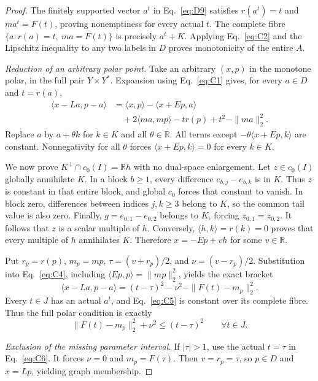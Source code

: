 \documentclass[11pt]{article}
\newcommand{\R}{\mathbb R}
\newcommand{\pair}[2]{\langle #1,#2\rangle}
\begin{document}
\begin{proof}
The finitely supported vector $a^t$ in Eq.~\eqref{eq:D9} satisfies $r(a^t)=t$ and
$ma^t=F(t)$, proving nonemptiness for every actual $t$. The complete
fibre $\{a:r(a)=t,\ ma=F(t)\}$ is precisely $a^t+K$.
Applying Eq.~\eqref{eq:C2} and the Lipschitz inequality to any two labels
in $D$ proves monotonicity of the entire $A$.

\noindent\textit{Reduction of an arbitrary polar point.}
\label{sec:C3}
Take an arbitrary $(x,p)$ in the monotone polar, in the full pair
$Y\times Y^*$. Expansion using Eq.~\eqref{eq:C1} gives, for every
$a\in D$ and $t=r(a)$,
\begin{equation}
\begin{aligned}
\pair{x-La}{p-a}
 &=\pair{x}{p}-\pair{x+Ep}{a}\\
 &\quad+2\pair{ma}{mp}-t r(p)+t^2-\|ma\|_2^2.
\end{aligned}
\tag{C4}\label{eq:C4}
\end{equation}
Replace $a$ by $a+\theta k$ for $k\in K$ and all $\theta\in\R$.
All terms except $-\theta\pair{x+Ep}{k}$ are constant.
Nonnegativity for all $\theta$ forces $\pair{x+Ep}{k}=0$ for every $k\in K$.

We now prove $K^\perp\cap c_0(I)=\R h$ with no dual-space enlargement.
Let $z\in c_0(I)$ globally annihilate $K$. In a block $b\ge1$, every
difference $e_{b,j}-e_{b,k}$ is in $K$. Thus $z$ is constant in that
entire block, and global $c_0$ forces that constant to vanish. In block
zero, differences between indices $j,k\ge3$ belong to $K$, so the common
tail value is also zero. Finally, $g=e_{0,1}-e_{0,2}$ belongs to $K$,
forcing $z_{0,1}=z_{0,2}$. It follows that $z$ is a scalar multiple of
$h$. Conversely, $\pair{h}{k}=r(k)=0$ proves that every multiple of $h$
annihilates $K$. Therefore $x=-Ep+vh$ for some $v\in\R$.

Put $r_p=r(p)$, $m_p=mp$, $\tau=(v+r_p)/2$, and $\nu=(v-r_p)/2$.
Substitution into Eq.~\eqref{eq:C4}, including
$\pair{Ep}{p}=\|mp\|_2^2$, yields the exact bracket
\begin{equation}
\pair{x-La}{p-a}
 =(t-\tau)^2-\nu^2-\|F(t)-m_p\|_2^2.
\tag{C5}\label{eq:C5}
\end{equation}
Every $t\in J$ has an actual $a^t$, and Eq.~\eqref{eq:C5} is constant
over its complete fibre. Thus the full polar condition is exactly
\begin{equation}
\|F(t)-m_p\|_2^2+\nu^2\le(t-\tau)^2
\qquad\forall t\in J.
\tag{C6}\label{eq:C6}
\end{equation}

\noindent\textit{Exclusion of the missing parameter interval.}
\label{sec:C4}
If $|\tau|>1$, use the actual $t=\tau$ in Eq.~\eqref{eq:C6}. It forces
$\nu=0$ and $m_p=F(\tau)$. Then $v=r_p=\tau$, so $p\in D$ and $x=Lp$,
yielding graph membership.


\end{proof}
\end{document}
